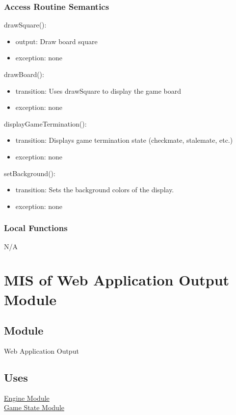 \documentclass[12pt, titlepage]{article}
\begin{document}
    \subsubsection{Access Routine Semantics}
        \noindent drawSquare():
        \begin{itemize}
            \item output: Draw board square
            \item exception: none
        \end{itemize}

        \noindent drawBoard():
        \begin{itemize}
            \item transition: Uses drawSquare to display the game board
            \item exception: none
        \end{itemize}

        \noindent displayGameTermination():
        \begin{itemize}
            \item transition: Displays game termination state (checkmate, stalemate, etc.)
            \item exception: none
        \end{itemize}

        \noindent setBackground():
        \begin{itemize}
            \item transition: Sets the background colors of the display.
            \item exception: none
        \end{itemize}

    \subsubsection{Local Functions}
    N/A

    \newpage

\section{MIS of Web Application Output Module} \label{mOutput}

    \subsection{Module}
    Web Application Output

    \subsection{Uses}
    \hyperref[mEngine]{Engine Module}\\
    \hyperref[mGame]{Game State Module}
\end{document}
